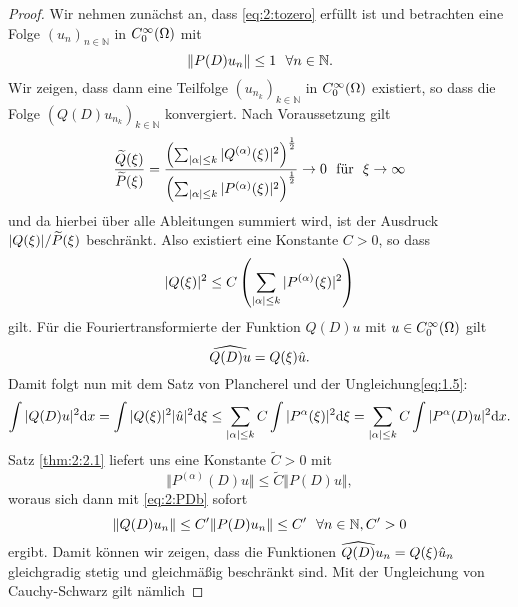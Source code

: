 \begin{proof}
\item Wir nehmen zunächst an, dass \eqref{eq:2:tozero} erfüllt ist und betrachten eine Folge ${(u_n)}_{n \in \mathbb{N}} $ in $C^\infty_0(\Omega)$ mit
\begin{equation}\label{eq:2:PDb}
\lVert P(D)u_n\rVert\leq1 \ \ \forall n \in \mathbb{N}.
\end{equation}
Wir zeigen, dass dann eine Teilfolge ${(u_{n_k})}_{k \in \mathbb{N}}$ in $C^\infty_0(\Omega)$ existiert,
so dass die Folge $\left(Q(D)u_{n_k}\right)_{k \in \mathbb{N}}$ konvergiert.
Nach Voraussetzung gilt 
\begin{equation}
\frac{\widetilde{Q}(\xi)}{\widetilde{P}(\xi)} = \frac{\left( \sum_{|\alpha| \leq k} | Q^{(\alpha)} (\xi)|^2 \right)^{\frac{1}{2}} }{ \left(\sum_{|\alpha| \leq k} | P^{(\alpha)} (\xi)|^2\right)^{\frac{1}{2}}} \rightarrow 0\ \ \text{für} \ \ \xi \rightarrow \infty
\end{equation}
und da hierbei über alle Ableitungen summiert wird, ist der Ausdruck $|Q(\xi)|/\widetilde{P}(\xi)$ beschränkt. Also existiert eine Konstante $C>0$, so dass
\begin{equation}
|Q(\xi)|^2 \leq C \left(\sum_{|\alpha| \leq k} | P^{(\alpha)} (\xi)|^2 \right)\label{eq:1.5}
\end{equation}
gilt. Für die Fouriertransformierte der Funktion $Q(D)u$ mit $u \in C^\infty_0(\Omega)$ gilt 
\begin{equation}
\widehat{Q(D)u} = Q(\xi) \hat{u}.
\end{equation}
Damit folgt nun mit dem Satz von Plancherel und der Ungleichung\eqref{eq:1.5}:
\begin{equation}
\int |Q(D)u|^2 \mathrm{d}x = \int |Q(\xi)|^2 |\hat{u}|^2 \mathrm{d}\xi \leq  \sum_{|\alpha| \leq k}C\int | P^{\alpha} (\xi)|^2 \mathrm{d}\xi =\sum_{|\alpha| \leq k} C\int |P^{\alpha}(D)u|^2 \mathrm{d}x.
\end{equation}
Satz \ref{thm:2:2.1} liefert uns eine Konstante $\widetilde{C}>0$ mit
\begin{equation}
\Vert P^{(\alpha)}(D)u \Vert \leq \widetilde{C} \Vert P(D)u \Vert, \label{eq:ableitung leq PD}
\end{equation}
woraus sich dann mit \eqref{eq:2:PDb} sofort
\begin{equation}
\norm{Q(D)u_n}\leq C' \norm{P(D)u_n} \leq C' \ \ \forall n \in \mathbb{N}, C' >0
\end{equation}
ergibt. Damit können wir zeigen, dass die Funktionen $\widehat{Q(D)}u_n = Q(\xi) \hat{u}_n$ gleichgradig stetig und gleichmäßig beschränkt sind. Mit der Ungleichung von Cauchy-Schwarz gilt nämlich

\end{proof}
